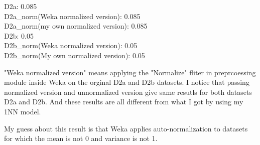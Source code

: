 \documentclass[a4paper]{article}
\theoremstyle{definition}
\newenvironment{soln}{
    \leavevmode\color{blue}\ignorespaces
}{}
\begin{document}
\begin{enumerate}
\begin{soln}
D2a: 0.085\\
D2a\_norm(Weka normalized version): 0.085\\
D2a\_norm(my own normalized version): 0.085 \\
D2b: 0.05\\
D2b\_norm(Weka normalized version): 0.05\\
D2b\_norm(My own normalized version): 0.05

"Weka normalized version"  means applying the "Normalize" fliter in preprcoessing module inside Weka on the orginal D2a and D2b datasets.
I notice that passing normalized version and unnormalized version give same resutls for both datasets D2a and D2b. And these results are all different from what I got by using my 1NN model. 

My guess about this result is that Weka applies auto-normalization to datasets for which the mean is not 0 and variance is not 1.
\end{soln}

\end{enumerate}


\end{document}
